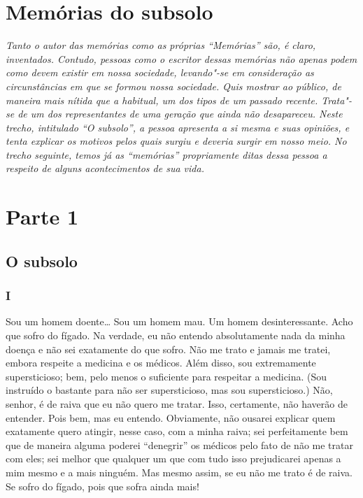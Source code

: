 \part{Memórias do subsolo}

{
	
\mbox{}
\vfill
\thispagestyle{empty}

\hfill \textit{Tanto o autor das memórias como as próprias “Memórias” são, é claro,
inventados. Contudo, pessoas como o escritor dessas memórias não apenas podem
como devem existir em nossa sociedade, levando"-se em consideração as
circunstâncias em que se formou nossa sociedade. Quis mostrar ao público, de
maneira mais nítida que a habitual, um dos tipos de um passado recente.
Trata"-se de um dos representantes de uma geração que ainda não desapareceu.
Neste trecho, intitulado “O subsolo”, a pessoa apresenta a si mesma e suas
opiniões, e tenta explicar os motivos pelos quais surgiu e deveria surgir em
nosso meio. No trecho seguinte, temos já as “memórias” propriamente ditas dessa
pessoa a respeito de alguns acontecimentos de sua vida.}

}

\part{Parte 1}

\chapter{O subsolo}

\section{I}

Sou um homem doente\ldots{} Sou um homem mau. Um homem desinteressante. Acho
que sofro do fígado. Na verdade, eu não entendo absolutamente nada da
minha doença e não sei exatamente do que sofro. Não me trato e jamais
me tratei, embora respeite a medicina e os médicos. Além disso, sou
extremamente supersticioso; bem, pelo menos o suficiente para respeitar
a medicina. (Sou instruído o bastante para não ser supersticioso, mas
sou supersticioso.) Não, senhor, é de raiva que eu não quero me tratar.
Isso, certamente, não haverão de entender. Pois bem, mas eu entendo.
Obviamente, não ousarei explicar quem exatamente quero atingir, nesse
caso, com a minha raiva; sei perfeitamente bem que de maneira alguma
poderei “denegrir” os médicos pelo fato de não me tratar com eles; sei
melhor que qualquer um que com tudo isso prejudicarei apenas a mim
mesmo e a mais ninguém. Mas mesmo assim, se eu não me trato é de raiva.
Se sofro do fígado, pois que sofra ainda mais!

